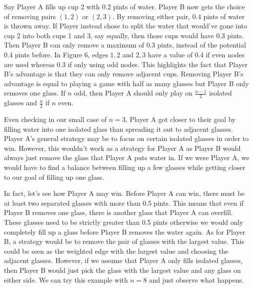 \documentclass[11pt]{article}
\newcommand{\keywordfont}{\textsc}
\newcommand{\keyword}[1]{%
  \marginpar{\raggedright\small\keywordfont{#1}}}
\begin{document}
Say Player A fills \keyword{Justify} up cup 2 with 0.2 pints of water. Player B now gets the choice of removing pairs $(1,2)$ or $(2,3)$. By removing either pair, 0.4 pints of water is thrown away. If Player instead chose to split the water that would've gone into cup 2 into both cups 1 and 3, say equally, then those cups would have 0.3 pints. Then Player B can only remove a maximum of 0.3 pints, instead of the potential 0.4 pints before. In Figure 6, edges ${1,2}$ and ${2,3}$ have a value of 0.4 if even nodes are used whereas 0.3 if only using odd nodes. This highlights the fact that Player B's advantage is that they can only remove adjacent cups. Removing Player B's advantage is equal to playing a game with half as many glasses but Player B only removes one glass. If $n$ odd, then Player A should only play on $\frac{n-1}{2}$ isolated glasses and $\frac{n}{2}$ if $n$ even.


Even checking \keyword{Check} in our small case of $n=3$, Player A got closer to their goal by filling water into one isolated glass than spreading it out to adjacent glasses. Player A's general strategy may be to focus on certain isolated glasses in order to win. However, this wouldn't work as a strategy for Player A as Player B would always just remove the glass that Player A puts water in. \keyword{Stuck} If we were Player A, we would have to find a balance between filling up a few glasses while getting closer to our goal of filling up one glass.

In fact, let's see how Player A may win. Before Player A can win, there must be at least two separated glasses with more than 0.5 pints. This means that even if Player B removes one glass, there is another glass that Player A can overfill. \keyword{AHA} These glasses need to be strictly greater than 0.5 pints otherwise we would only completely fill up a glass before Player B removes the water again. As for Player B, a strategy would be to remove the pair of glasses with the largest value. This could be seen as the weighted edge with the largest value and choosing the adjacent glasses. However, if we assume that Player A only fills isolated glasses, then Player B would just pick the glass with the largest value and any glass on either side. We can \keyword{Try} try this example with $n=8$ and just observe what happens.
\end{document}
